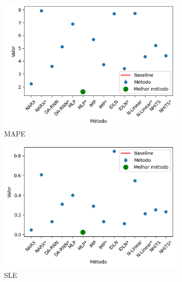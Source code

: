 \begin{figure}[htbp]
	\centering
	\begin{subfigure}[b]{0.3\textwidth}
		\centering
		\includegraphics[width=\textwidth]{figuras/mape_brasil_oil_results_test.png}
		\caption{\ac{MAPE}}
		\label{fig:mape_brasil_oil_results_test}
	\end{subfigure}
	\hfill
	\begin{subfigure}[b]{0.3\textwidth}
		\centering
		\includegraphics[width=\textwidth]{figuras/sle_brasil_oil_results_test.png}
		\caption{\ac{SLE}}
		\label{fig:sle_brasil_oil_results_test}
	\end{subfigure}
	\hfill
	\begin{subfigure}[b]{0.3\textwidth}
		\centering

\end{subfigure}
\end{figure}
